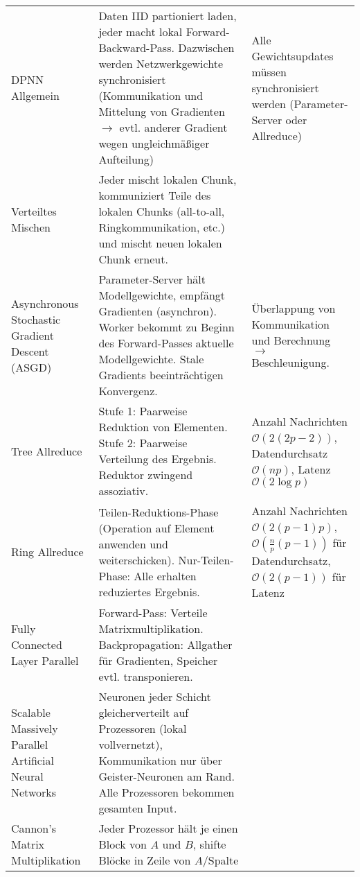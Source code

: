 \documentclass[11pt]{scrartcl}
\begin{document}
\begin{xltabular}{\linewidth}{p{25mm}|p{70mm}p{35mm}}
    & \vspace{-1em} & \\ \hline
    DPNN Allgemein &
        Daten IID partioniert laden, jeder macht lokal Forward-Backward-Pass. Dazwischen werden 
        Netzwerkgewichte synchronisiert (Kommunikation und Mittelung von Gradienten $\rightarrow$ 
        evtl. anderer Gradient wegen ungleichmäßiger Aufteilung) & Alle Gewichtsupdates müssen
        synchronisiert werden (Parameter-Server oder Allreduce) \\
    \hline
    Verteiltes Mischen &
        Jeder mischt lokalen Chunk, kommuniziert Teile des lokalen Chunks (all-to-all, 
        Ringkommunikation, etc.) und mischt neuen lokalen Chunk erneut. & \\
    \hline
    Asynchronous Stochastic Gradient Descent (ASGD) &
        Parameter-Server hält Modellgewichte, empfängt Gradienten (asynchron). Worker bekommt zu
        Beginn des Forward-Passes aktuelle Modellgewichte. Stale Gradients beeinträchtigen 
        Konvergenz. & Überlappung von Kommunikation und Berechnung $\rightarrow$ Beschleunigung. \\
    \hline
    Tree Allreduce &
        Stufe 1: Paarweise Reduktion von Elementen. Stufe 2: Paarweise Verteilung des Ergebnis.
        Reduktor zwingend assoziativ. &
        Anzahl Nachrichten $\mathcal{O}(2(2p - 2))$, Datendurchsatz $\mathcal{O}(np)$, Latenz 
        $\mathcal{O}(2 \log p)$ \\
    \hline
    Ring Allreduce &
        Teilen-Reduktions-Phase (Operation auf Element anwenden und weiterschicken). 
        Nur-Teilen-Phase: Alle erhalten reduziertes Ergebnis. &
        Anzahl Nachrichten $\mathcal{O}(2(p - 1)p)$, $\mathcal{O}(\frac{n}{p}(p - 1))$ für 
        Datendurchsatz, $\mathcal{O}(2(p - 1))$ für Latenz \\
    \hline
    Fully Connected Layer Parallel &
        Forward-Pass: Verteile Matrixmultiplikation. Backpropagation: Allgather für Gradienten, 
        Speicher evtl. transponieren. & \\
    \hline
    Scalable Massively Parallel Artificial Neural Networks &
        Neuronen jeder Schicht gleicherverteilt auf Prozessoren (lokal vollvernetzt), 
        Kommunikation nur über Geister-Neuronen am Rand. Alle Prozessoren bekommen gesamten Input. &
    \\
    \hline
    Cannon's Matrix Multiplikation &
        Jeder Prozessor hält je einen Block von $A$ und $B$, shifte Blöcke in Zeile von $A$/Spalte 

\end{xltabular}
\end{document}
